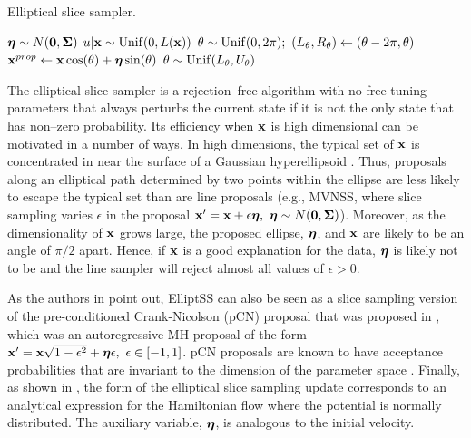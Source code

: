 \begin{algorithm}[htbp]
	\caption{Elliptical slice sampler.}\label{alg:elliptical_slice_sampler}
	\begin{algorithmic}[1]
		\State $ \boldsymbol{\eta} \sim N(\boldsymbol{0}, \boldsymbol{\Sigma}) $ 
		\State $ u|\mathbf{x} \sim \mathrm{Unif}(0, L(\mathbf{x})) $ 
		\State $\theta \sim \mr{Unif}(0,2\pi);\ 
		(L_{\theta}, R_\theta) \gets (\theta - 2\pi, \theta)$ 
		\State $ \mathbf{x} ^{prop}\gets\mathbf{x}\cos(\theta) + \boldsymbol{\eta}\sin(\theta) $ 
		\If{$ L(\prop{\bx}) > u $}{ $ \new{\bx}\gets\prop{\bx} $}\Comment{Accept proposal}
		\State\Return{ $ \new{\bx} $}
		\Else{}
		\EndIf
		\State $ \theta\sim\mathrm{Unif}(L_\theta,U_\theta) $ 
		\State{\textbf{GoTo} 5} 
		\EndIf
		\EndProcedure
	\end{algorithmic}
\end{algorithm}

The elliptical slice sampler is a rejection--free algorithm with no free tuning parameters that always perturbs the current state if it is not the only state that has non--zero probability. Its efficiency when $ \mathbf{x} $ is high dimensional can be motivated in a number of ways. In high dimensions, the typical set of $ \mathbf{x} $ is concentrated in near the surface of a Gaussian hyperellipsoid \cite{betancourt2017conceptual,murray2010}. Thus, proposals along an elliptical path determined by two points within the ellipse are less likely to escape the typical set than are line proposals (e.g., MVNSS, where slice sampling varies $ \epsilon $ in the proposal $ \bx' = \bx + \epsilon\boeta,\ \boeta \sim N(\bs{0},\bSigma)$). Moreover, as the dimensionality of $ \mathbf{x} $ grows large, the proposed ellipse, $ \boldsymbol{\eta} $, and $ \mathbf{x} $ are likely to be an angle of $ \pi/2 $ apart. Hence, if $ \mathbf{x} $ is a good explanation for the data, $ \boldsymbol{\eta} $ is likely not to be and the line sampler will reject almost all values of $ \epsilon>0 $. 

As the authors in \cite{murray2010} point out, ElliptSS can also be seen as a slice sampling version of the pre-conditioned Crank-Nicolson (pCN) proposal that was proposed in \cite{neal1998regression}, which was an autoregressive MH proposal of the form  $ \mathbf{x}' = \mathbf{x}\sqrt{1-\epsilon^2} + \boldsymbol{\eta}\epsilon,\ \epsilon\in[-1,1] $. pCN proposals are known to have acceptance probabilities that are invariant to the dimension of the parameter space \cite{cotter2013mcmc}. Finally, as shown in \cite{bloem2016slice}, the form of the elliptical slice sampling update corresponds to an analytical expression for the Hamiltonian flow where the potential is normally distributed. The auxiliary variable, $ \boldsymbol{\eta} $, is analogous to the initial velocity. 

